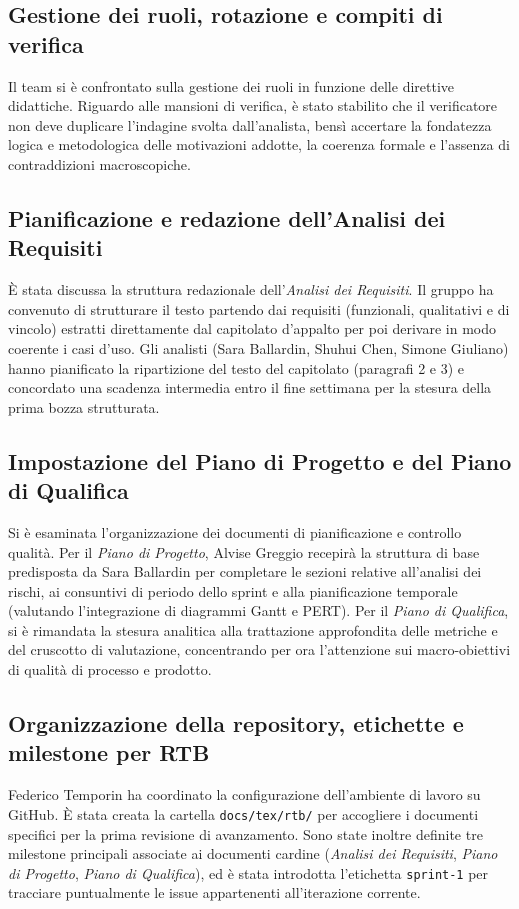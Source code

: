 \documentclass[11pt, a4paper]{article}
\begin{document}
\subsection{Gestione dei ruoli, rotazione e compiti di verifica}
Il team si è confrontato sulla gestione dei ruoli in funzione delle direttive didattiche. Riguardo alle mansioni di verifica, è stato stabilito che il verificatore non deve duplicare l'indagine svolta dall'analista, bensì accertare la fondatezza logica e metodologica delle motivazioni addotte, la coerenza formale e l'assenza di contraddizioni macroscopiche.

\subsection{Pianificazione e redazione dell'Analisi dei Requisiti}
È stata discussa la struttura redazionale dell'\textit{Analisi dei Requisiti}. Il gruppo ha convenuto di strutturare il testo partendo dai requisiti (funzionali, qualitativi e di vincolo) estratti direttamente dal capitolato d'appalto per poi derivare in modo coerente i casi d'uso. Gli analisti (Sara Ballardin, Shuhui Chen, Simone Giuliano) hanno pianificato la ripartizione del testo del capitolato (paragrafi 2 e 3) e concordato una scadenza intermedia entro il fine settimana per la stesura della prima bozza strutturata.

\subsection{Impostazione del Piano di Progetto e del Piano di Qualifica}
Si è esaminata l'organizzazione dei documenti di pianificazione e controllo qualità. Per il \textit{Piano di Progetto}, Alvise Greggio recepirà la struttura di base predisposta da Sara Ballardin per completare le sezioni relative all'analisi dei rischi, ai consuntivi di periodo dello sprint e alla pianificazione temporale (valutando l'integrazione di diagrammi Gantt e PERT). Per il \textit{Piano di Qualifica}, si è rimandata la stesura analitica alla trattazione approfondita delle metriche e del cruscotto di valutazione, concentrando per ora l'attenzione sui macro-obiettivi di qualità di processo e prodotto.

\subsection{Organizzazione della repository, etichette e milestone per RTB}
Federico Temporin ha coordinato la configurazione dell'ambiente di lavoro su GitHub. È stata creata la cartella \texttt{docs/tex/rtb/} per accogliere i documenti specifici per la prima revisione di avanzamento. Sono state inoltre definite tre milestone principali associate ai documenti cardine (\textit{Analisi dei Requisiti}, \textit{Piano di Progetto}, \textit{Piano di Qualifica}), ed è stata introdotta l'etichetta \texttt{sprint-1} per tracciare puntualmente le issue appartenenti all'iterazione corrente.
\end{document}
